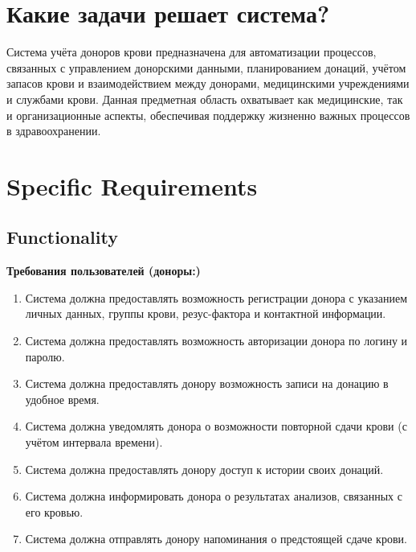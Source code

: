 \documentclass[a4paper,12pt]{article}
\begin{document}

\section*{Какие задачи решает система?}

Система учёта доноров крови предназначена для автоматизации процессов, 
связанных с управлением донорскими данными, планированием донаций, учётом 
запасов крови и взаимодействием между донорами, медицинскими учреждениями и 
службами крови. Данная предметная область охватывает как медицинские, так и 
организационные аспекты, обеспечивая поддержку жизненно важных процессов 
в здравоохранении.


\section*{Specific Requirements}

\subsection*{Functionality}

\textbf{Требования пользователей (доноры:)}

\begin{enumerate}[label=UF\arabic*]
  \item Система должна предоставлять возможность регистрации донора с указанием личных данных, группы крови, резус-фактора и контактной информации.
  \item Система должна предоставлять возможность авторизации донора по логину и паролю.
  \item Система должна предоставлять донору возможность записи на донацию в удобное время.
  \item Система должна уведомлять донора о возможности повторной сдачи крови (с учётом интервала времени).
  \item Система должна предоставлять донору доступ к истории своих донаций.
  \item Система должна информировать донора о результатах анализов, связанных с его кровью.
  \item Система должна отправлять донору напоминания о предстоящей сдаче крови.
\end{enumerate}
\end{document}
